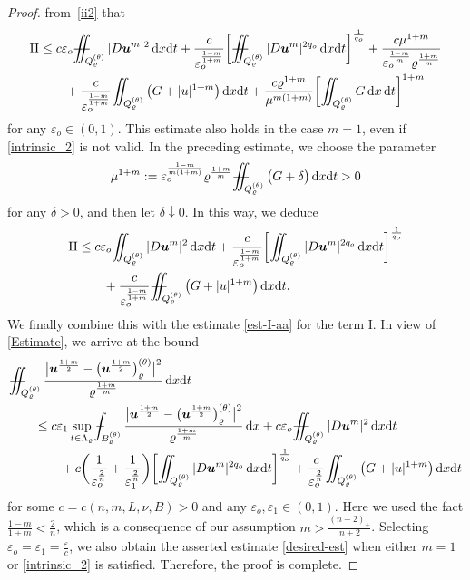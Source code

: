 \documentclass[a4paper, 10pt, american]{amsart}
\numberwithin{theorem}{section}
\numberwithin{equation}{section}
\newcommand{\dxdt}{\,\mathrm{d}x\mathrm{d}t}
\newcommand{\dx}{\,\mathrm{d}x}
\newcommand{\dt}{\,\mathrm{d}t}
\renewcommand{\epsilon}{\varepsilon}
\renewcommand{\epsilon}{\varepsilon}
\newcommand{\eps}{\varepsilon}
\renewcommand{\rho}{\varrho}
\newcommand{\power}[2]{\bm{#1^{\mbox{\unboldmath{\scriptsize$#2$}}}}}
\def\Xint#1{\mathchoice
    {\XXint\displaystyle\textstyle{#1}}%
    {\XXint\textstyle\scriptstyle{#1}}%
    {\XXint\scriptstyle\scriptscriptstyle{#1}}%
    {\XXint\scriptscriptstyle\scriptscriptstyle{#1}}%
    \!\int}
\def\XXint#1#2#3{\setbox0=\hbox{$#1{#2#3}{\int}$}
    \vcenter{\hbox{$#2#3$}}\kern-0.5\wd0}
\def\bint{\Xint-}
\def\Xiint#1{\mathchoice
    {\XXiint\displaystyle\textstyle{#1}}%
    {\XXiint\textstyle\scriptstyle{#1}}%
    {\XXiint\scriptstyle\scriptscriptstyle{#1}}%
    {\XXiint\scriptscriptstyle\scriptscriptstyle{#1}}%
    \!\iint}
\def\XXiint#1#2#3{\setbox0=\hbox{$#1{#2#3}{\iint}$}
    \vcenter{\hbox{$#2#3$}}\kern-0.5\wd0}
\def\biint{\Xiint{-\!-}}
\begin{document}
\begin{proof}
from~\eqref{ii2} that 
\begin{align}\label{ii3}
\nonumber
{\rm{II}}
&\le
c\epsilon_o \biint_{Q_\rho^{(\theta)}} |D\power um|^2 \dxdt
+
 \frac{c}{\epsilon_o^{\frac{1-m}{1+m}}} \bigg[\biint_{Q_\rho^{(\theta)}} |D\power um|^{2q_o}\dxdt\bigg]^{\frac1{q_o}}
+
\frac{c\mu^{1+m}}{\epsilon_o^{\frac{1-m}m}\rho^{\frac{1+m}m}}  \\
&\qquad+
\frac{c}{\epsilon_o^{\frac{1-m}{1+m}}}\biint_{Q_\rho^{(\theta)}}
\big(G + |u|^{1+m}\big) \dxdt 
+
 \frac{c\rho^{1+m}}{\mu^{m(1+m)}}
  \bigg[ \biint_{Q_\rho^{(\theta)}}
  G\dx\dt \bigg]^{1+m}
\end{align}
for any $\epsilon_o\in(0,1)$.
This estimate also holds in the case $m=1$,
even if \eqref{intrinsic_2} is not valid. 
In the preceding estimate, we choose the parameter 
\begin{align*}
  \mu^{1+m} :=\eps_o^{\frac{1-m}{m(1+m)}}
\rho^{\frac{1+m}m}\biint_{Q_\rho^{(\theta)}} \big(G+\delta\big) \dxdt >0
\end{align*}
for any $\delta>0$, and then let $\delta\downarrow0$. In this way, we deduce 
\begin{align}
\nonumber
{\rm{II}}
&\le
c\epsilon_o \biint_{Q_\rho^{(\theta)}} |D\power um|^2 \dxdt
+
\frac{ c}{\epsilon_o^{\frac{1-m}{1+m}}} \bigg[\biint_{Q_\rho^{(\theta)}} |D\power um|^{2q_o}\dxdt\bigg]^{\frac1{q_o}}\\\nonumber
&\qquad+
\frac{ c}{\epsilon_o^{\frac{1-m}{1+m}}}\biint_{Q_\rho^{(\theta)}} \big(G+|u|^{1+m}\big)\dxdt.
\end{align}
We finally combine this with the estimate \eqref{est-I-aa} for
the term $\mathrm{I}$. In view of \eqref{Estimate}, we arrive at the bound
\begin{align}
\nonumber
&\biint_{Q_\rho^{(\theta)}}\frac{\big|\power u {\frac{1+m}2}- \big(\power u {\frac{1+m}2}\big)_\rho^{(\theta)}\big|^2}{\rho^{\frac{1+m}m}}\dxdt \\\nonumber
&\qquad\le
c\epsilon_1\sup_{t\in \Lambda_\rho}\bint_{B_\rho^{(\theta)} }\frac{\big|\power u{\frac{1+m}2} - \big(\power u{\frac{1+m}2}\big)_\rho^{(\theta)}\big|^2 }{\rho^{\frac{1+m}m}} \dx 
+
c\epsilon_o \biint_{Q_\rho^{(\theta)}} |D\power um|^2 \dxdt\\\nonumber
&\qquad\qquad+
c\bigg(\frac{ 1}{\epsilon_o^{\frac{2}{n}}}+\frac{ 1}{\epsilon_1^{\frac{2}{n}}}\bigg) \bigg[\biint_{Q_\rho^{(\theta)}} |D\power um|^{2q_o}\dxdt\bigg]^{\frac1{q_o}}
+
\frac{ c}{\epsilon_o^{\frac{2}{n}}}\biint_{Q_\rho^{(\theta)}} \big(G+|u|^{1+m}\big)\dxdt
\end{align}
for some $c=c(n,m,L,\nu,B)>0$ and any $\eps_o,\eps_1\in(0,1)$. Here we
used the fact $\frac{1-m}{1+m}<\frac2n$, which is a consequence of
our assumption $m>\frac{(n-2)_+}{n+2}$.
Selecting $\epsilon_o=\epsilon_1=\frac{\epsilon}{c}$, we also obtain
the asserted estimate \eqref{desired-est} when either $m=1$ or \eqref{intrinsic_2} is satisfied.
Therefore, the proof is complete.
\end{proof}
\end{document}
